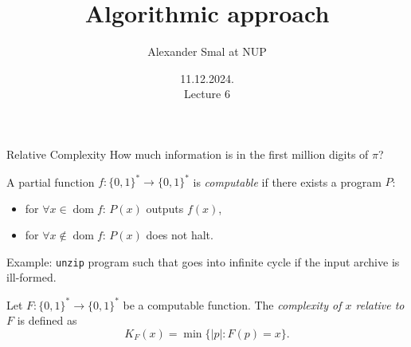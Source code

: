 \documentclass[
aspectratio=169]{beamer}
\title{Algorithmic approach}
\author{Alexander Smal at NUP}
\date{11.12.2024.\\ Lecture 6}
\newcommand{\bits}{\{0,1\}}
\newcommand{\bitstr}{\bits^*}
\DeclareMathOperator{\dom}{dom}
\begin{document}
\begin{frame}[plain]
    \maketitle
\end{frame}

\begin{frame}{Relative Complexity}
How much information is in the first million digits of $\pi$?

\pause
\begin{definition}
    A partial function $f:\bitstr\to\bitstr$ is \emph{computable} if there exists a program $P$:
    \begin{itemize}
        \item for $\forall x \in \dom f$: $P(x)$ outputs $f(x)$,
        \item for $\forall x \not\in \dom f$: $P(x)$ does not halt.
    \end{itemize}
\end{definition}

\pause
Example: \texttt{unzip} program such that goes into infinite cycle if the input archive is ill-formed.

\pause
\begin{definition}
    Let $F:\bitstr\to\bitstr$ be a computable function. The \emph{complexity of $x$ relative to $F$} is defined as
    \[K_F(x) = \min\{|p| : F(p) = x\}.\]
\end{definition}
\end{frame}


\end{document}
